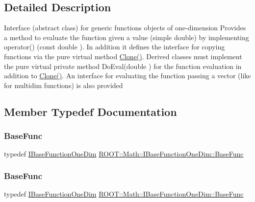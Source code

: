 \subsection{Detailed Description}
Interface (abstract class) for generic functions objects of one-\/dimension Provides a method to evaluate the function given a value (simple double) by implementing operator() (const double ). In addition it defines the interface for copying functions via the pure virtual method \mbox{\hyperlink{classROOT_1_1Math_1_1IBaseFunctionOneDim_a656dbb4dfc43e8d1566442bfb1a717fd}{Clone()}}. Derived classes must implement the pure virtual private method Do\+Eval(double ) for the function evaluation in addition to \mbox{\hyperlink{classROOT_1_1Math_1_1IBaseFunctionOneDim_a656dbb4dfc43e8d1566442bfb1a717fd}{Clone()}}. An interface for evaluating the function passing a vector (like for multidim functions) is also provided 

\subsection{Member Typedef Documentation}
\mbox{\label{classROOT_1_1Math_1_1IBaseFunctionOneDim_a87fee465cea6b03c55aa6bc1cf641cc9}} 
\subsubsection{\texorpdfstring{BaseFunc}{BaseFunc}\hspace{0.1cm}{\footnotesize\ttfamily [1/3]}}
{\footnotesize\ttfamily typedef \mbox{\hyperlink{classROOT_1_1Math_1_1IBaseFunctionOneDim}{I\+Base\+Function\+One\+Dim}} \mbox{\hyperlink{classROOT_1_1Math_1_1IBaseFunctionOneDim_a87fee465cea6b03c55aa6bc1cf641cc9}{R\+O\+O\+T\+::\+Math\+::\+I\+Base\+Function\+One\+Dim\+::\+Base\+Func}}}

\mbox{\label{classROOT_1_1Math_1_1IBaseFunctionOneDim_a87fee465cea6b03c55aa6bc1cf641cc9}} 
\subsubsection{\texorpdfstring{BaseFunc}{BaseFunc}\hspace{0.1cm}{\footnotesize\ttfamily [2/3]}}
{\footnotesize\ttfamily typedef \mbox{\hyperlink{classROOT_1_1Math_1_1IBaseFunctionOneDim}{I\+Base\+Function\+One\+Dim}} \mbox{\hyperlink{classROOT_1_1Math_1_1IBaseFunctionOneDim_a87fee465cea6b03c55aa6bc1cf641cc9}{R\+O\+O\+T\+::\+Math\+::\+I\+Base\+Function\+One\+Dim\+::\+Base\+Func}}}

